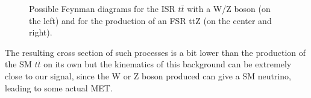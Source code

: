 \documentclass[a4paper, 10pt, openright]{report}
\begin{document}
\begin{figure}[htbp]
\begin{minipage}[b]{.29\textwidth}
{
}
\end{minipage} 
\caption{Possible Feynman diagrams for the \ac{ISR} $t \bar t$ with a W/Z boson (on the left) and for the production of an \ac{FSR} ttZ (on the center and right).}
\label{fig:ttV}
\end{figure}

The resulting cross section of such processes is a bit lower than the production of the \ac{SM} $t \bar t$ on its own but the kinematics of this background can be extremely close to our signal, since the W or Z boson produced can give a \ac{SM} neutrino, leading to some actual \ac{MET}.
\end{document}
